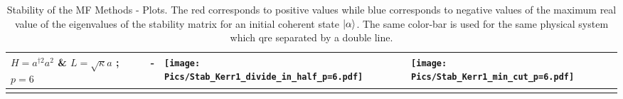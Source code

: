 \begin{landscape}
\begin{longtable}{|p{3cm}|p{7.2cm}|p{7.2cm}|p{7.2cm}|}
    \hline
    $H=a^{\dagger 2}a^2$ \& $L = \sqrt{\kappa} a$ ; $p=6$ &
    -&
    \begin{minipage}{7cm}
            \centering
            \texttt{[image: Pics/Stab\_Kerr1\_divide\_in\_half\_p=6.pdf]}
        \end{minipage}&
    \begin{minipage}{7cm}
        \centering
        \texttt{[image: Pics/Stab\_Kerr1\_min\_cut\_p=6.pdf]}
    \end{minipage}\\
    \hline
    \caption{Stability of the MF Methods - Plots. The red corresponds to positive values while blue corresponds to negative values of the maximum real value of the eigenvalues of the stability matrix for an initial coherent state $\ket{\alpha}$. The same color-bar is used for the same physical system which qre separated by a double line.}
    \label{tab:fig-table-stab}
\end{longtable}
\end{landscape}